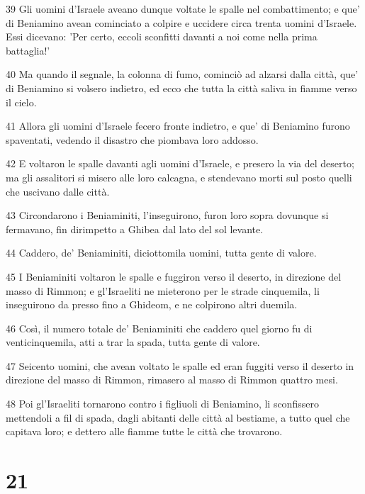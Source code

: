 \par 39 Gli uomini d'Israele aveano dunque voltate le spalle nel combattimento; e que' di Beniamino avean cominciato a colpire e uccidere circa trenta uomini d'Israele. Essi dicevano: 'Per certo, eccoli sconfitti davanti a noi come nella prima battaglia!'
\par 40 Ma quando il segnale, la colonna di fumo, cominciò ad alzarsi dalla città, que' di Beniamino si volsero indietro, ed ecco che tutta la città saliva in fiamme verso il cielo.
\par 41 Allora gli uomini d'Israele fecero fronte indietro, e que' di Beniamino furono spaventati, vedendo il disastro che piombava loro addosso.
\par 42 E voltaron le spalle davanti agli uomini d'Israele, e presero la via del deserto; ma gli assalitori si misero alle loro calcagna, e stendevano morti sul posto quelli che uscivano dalle città.
\par 43 Circondarono i Beniaminiti, l'inseguirono, furon loro sopra dovunque si fermavano, fin dirimpetto a Ghibea dal lato del sol levante.
\par 44 Caddero, de' Beniaminiti, diciottomila uomini, tutta gente di valore.
\par 45 I Beniaminiti voltaron le spalle e fuggiron verso il deserto, in direzione del masso di Rimmon; e gl'Israeliti ne mieterono per le strade cinquemila, li inseguirono da presso fino a Ghideom, e ne colpirono altri duemila.
\par 46 Così, il numero totale de' Beniaminiti che caddero quel giorno fu di venticinquemila, atti a trar la spada, tutta gente di valore.
\par 47 Seicento uomini, che avean voltato le spalle ed eran fuggiti verso il deserto in direzione del masso di Rimmon, rimasero al masso di Rimmon quattro mesi.
\par 48 Poi gl'Israeliti tornarono contro i figliuoli di Beniamino, li sconfissero mettendoli a fil di spada, dagli abitanti delle città al bestiame, a tutto quel che capitava loro; e dettero alle fiamme tutte le città che trovarono.

\chapter{21}

